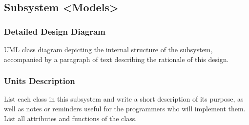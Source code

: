 \subsection{Subsystem <Models>}

\subsubsection{Detailed Design Diagram}

UML class diagram depicting the internal structure of the subsystem,
accompanied by a paragraph of text describing the rationale of this design.

\subsubsection{Units Description}

List each class in this subsystem and write a short description of its purpose,
as well as notes or reminders useful for the programmers who will implement them.
List all attributes and functions of the class.